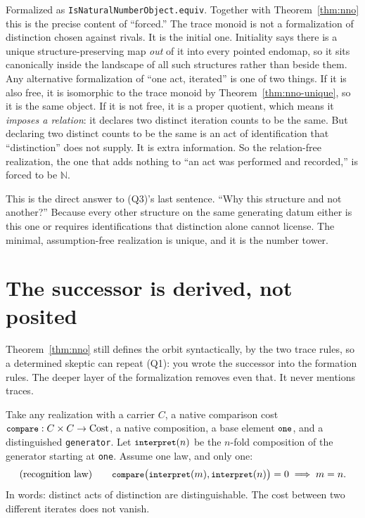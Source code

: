 \documentclass[11pt,a4paper]{article}
\theoremstyle{definition}
\theoremstyle{remark}
\newcommand{\code}[1]{\texttt{\small #1}}
\begin{document}
Formalized as \code{IsNaturalNumberObject.equiv}. Together with
Theorem~\ref{thm:nno} this is the precise content of ``forced.'' The trace
monoid is not a formalization of distinction chosen against rivals. It is the
initial one. Initiality says there is a unique structure-preserving map
\emph{out} of it into every pointed endomap, so it sits canonically inside the
landscape of all such structures rather than beside them. Any alternative
formalization of ``one act, iterated'' is one of two things. If it is also free,
it is isomorphic to the trace monoid by Theorem~\ref{thm:nno-unique}, so it is
the same object. If it is not free, it is a proper quotient, which means it
\emph{imposes a relation}: it declares two distinct iteration counts to be the
same. But declaring two distinct counts to be the same is an act of
identification that ``distinction'' does not supply. It is extra information. So
the relation-free realization, the one that adds nothing to ``an act was
performed and recorded,'' is forced to be $\mathbb{N}$.

This is the direct answer to (Q3)'s last sentence. ``Why this structure and not
another?'' Because every other structure on the same generating datum either is
this one or requires identifications that distinction alone cannot license. The
minimal, assumption-free realization is unique, and it is the number tower.

\section{The successor is derived, not posited}\label{sec:faithful}

Theorem~\ref{thm:nno} still defines the orbit syntactically, by the two trace
rules, so a determined skeptic can repeat (Q1): you wrote the successor into the
formation rules. The deeper layer of the formalization removes even that. It
never mentions traces.

Take any realization with a carrier $C$, a native comparison cost
$\code{compare} : C \times C \to \text{Cost}$, a native composition, a base
element $\code{one}$, and a distinguished \code{generator}. Let
$\code{interpret}(n)$ be the $n$-fold composition of the generator starting at
\code{one}. Assume one law, and only one:
\[
  \text{(recognition law)} \qquad
  \code{compare}\bigl(\code{interpret}(m), \code{interpret}(n)\bigr) = 0
  \;\Longrightarrow\; m = n .
\]
In words: distinct acts of distinction are distinguishable. The cost between two
different iterates does not vanish.
\end{document}
